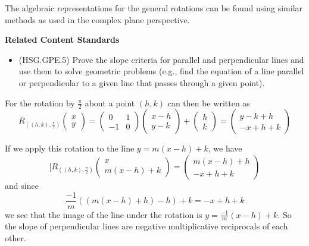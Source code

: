 \documentclass[
]{book}
\providecommand{\tightlist}{%
  \setlength{\itemsep}{0pt}\setlength{\parskip}{0pt}}
\newenvironment{standards}{}{}
\theoremstyle{definition}
\theoremstyle{definition}
\theoremstyle{definition}
\theoremstyle{definition}
\theoremstyle{remark}
\begin{document}
The algebraic representations for the general rotations can be found using similar methods as used in the complex plane perspective.

\begin{standards}

\begin{center}
\textbf{Related Content Standards}

\end{center}

\begin{itemize}
\tightlist
\item
  (HSG.GPE.5) Prove the slope criteria for parallel and perpendicular lines and use them to solve geometric problems (e.g., find the equation of a line parallel or perpendicular to a given line that passes through a given point).
\end{itemize}

\end{standards}

For the rotation by \(\frac{\pi}{2}\) about a point \((h,k)\) can then be written as
\[R_{((h,k),\frac{\pi}{2})}\begin{pmatrix} x \\ y \end{pmatrix} = \begin{pmatrix} 0 & 1 \\ -1 & 0 \end{pmatrix} \begin{pmatrix} x-h \\ y-k \end{pmatrix} + \begin{pmatrix} h \\ k \end{pmatrix} = \begin{pmatrix} y-k+h \\ -x+h+k  \end{pmatrix}\]

If we apply this rotation to the line \(y=m(x-h)+k\), we have
\[[R_{((h,k),\frac{\pi}{2})} \begin{pmatrix} x \\ m(x-h)+k \end{pmatrix} = \begin{pmatrix} m(x-h)+h \\ -x+h+k   \end{pmatrix}\] and since \[\frac{-1}{m} \left( (m(x-h)+h) -h\right)+k = -x+h+k\] we see that the image of the line under the rotation is \(y=\frac{-1}{m} (x-h)+k\). So the slope of perpendicular lines are negative multiplicative reciprocals of each other.
\end{document}

